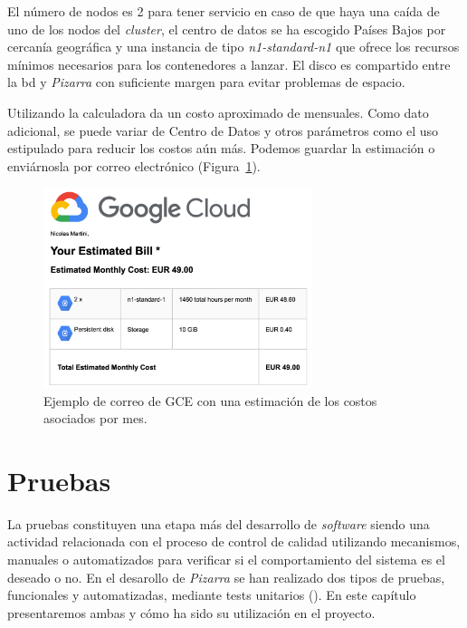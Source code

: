 \documentclass[11pt,spanish,listoffigures,listoftables]{tfgetsinf}
\begin{document}
El número de nodos es 2 para tener servicio en caso de que haya una caída de uno de los nodos del \textit{cluster}, el centro de datos se ha escogido Países Bajos por cercanía geográfica y una instancia de tipo \textit{n1-standard-n1} que ofrece los recursos mínimos necesarios para los contenedores a lanzar. El disco es compartido entre la \acrshort{bd} y \textit{Pizarra} con suficiente margen para evitar problemas de espacio.

Utilizando la calculadora da un costo aproximado de  mensuales. Como dato adicional, se puede variar de Centro de Datos y otros parámetros como el uso estipulado para reducir los costos aún más. Podemos guardar la estimación o enviárnosla por correo electrónico (Figura~\ref{figura:gce-estimated-cost-email}).

\begin{figure}[!t]
	\centering
	\includegraphics[width=0.70\textwidth]{img/google-cloud-engine-estimated-cost}
	\caption[Estimación de costos en GCE]{Ejemplo de correo de GCE con una estimación de los costos asociados por mes.}
	\label{figura:gce-estimated-cost-email}
\end{figure}

\chapter{Pruebas}

La pruebas constituyen una etapa más del desarrollo de \textit{software} siendo una actividad relacionada con el proceso de control de calidad utilizando mecanismos, manuales o automatizados para verificar si el comportamiento del sistema es el deseado o no. En el desarollo de \textit{Pizarra} se han realizado dos tipos de pruebas, funcionales y automatizadas, mediante tests unitarios (). En este capítulo presentaremos ambas y cómo ha sido su utilización en el proyecto.
\end{document}
